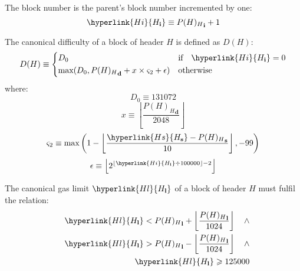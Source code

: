 \documentclass[9pt,oneside]{amsart}
\begin{document}
\begin{multicols}{2}
The block number is the parent's block number incremented by one:
\begin{equation}
\hyperlink{H i}{H_\mathbf{i}} \equiv {{P(H)_H}_\mathbf{i}} + 1
\end{equation}

\newcommand{\mindifficulty}{D_0}
\newcommand{\homesteadmod}{\ensuremath{\varsigma_2}}
\newcommand{\expdiffsymb}{\ensuremath{\epsilon}}
\newcommand{\diffadjustment}{x}

The canonical difficulty of a block of header $H$ is defined as $D(H)$:
\begin{equation}
D(H) \equiv \begin{dcases}
\mindifficulty & \text{if} \quad \hyperlink{H i}{H_\mathbf{i}} = 0\\
\text{max}\!\left(\mindifficulty, {P(H)_H}_\mathbf{d} + \diffadjustment\times\homesteadmod + \expdiffsymb \right) & \text{otherwise}\\
\end{dcases}
\end{equation}
where:
\begin{equation}
\mindifficulty \equiv 131072
\end{equation}
\begin{equation}
\diffadjustment \equiv \left\lfloor\frac{{P(H)_H}_\mathbf{d}}{2048}\right\rfloor
\end{equation}
\begin{equation}
\homesteadmod \equiv \text{max}\left( 1 - \left\lfloor\frac{\hyperlink{H s}{H_\mathbf{s}} - {P(H)_H}_\mathbf{s}}{10}\right\rfloor, -99 \right)
\end{equation}
\begin{equation}
\expdiffsymb \equiv \left\lfloor 2^{ \left\lfloor \hyperlink{H i}{H_\mathbf{i}} \div 100000 \right\rfloor - 2 } \right\rfloor
\end{equation}

The canonical gas limit $\hyperlink{H l}{H_\mathbf{l}}$ of a block of header $H$ must fulfil the relation:
\begin{eqnarray}
& & \hyperlink{H l}{H_\mathbf{l}} < {P(H)_H}_\mathbf{l} + \left\lfloor\frac{{P(H)_H}_\mathbf{l}}{1024}\right\rfloor \quad \wedge \\
& & \hyperlink{H l}{H_\mathbf{l}} > {P(H)_H}_\mathbf{l} - \left\lfloor\frac{{P(H)_H}_\mathbf{l}}{1024}\right\rfloor \quad \wedge \\
& & \hyperlink{H l}{H_\mathbf{l}} \geqslant 125000
\end{eqnarray}


\end{multicols}
\end{document}
